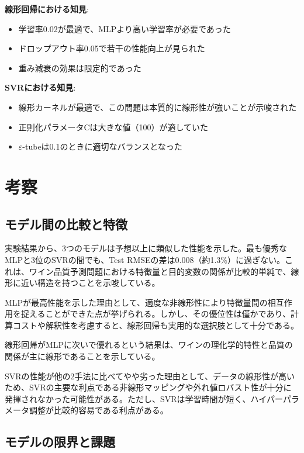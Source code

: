 \documentclass[12pt,a4paper,dvipdfmx]{jsarticle}
\begin{document}
\textbf{線形回帰における知見}:
\begin{itemize}
    \item 学習率0.02が最適で、MLPより高い学習率が必要であった
    \item ドロップアウト率0.05で若干の性能向上が見られた
    \item 重み減衰の効果は限定的であった
\end{itemize}

\textbf{SVRにおける知見}:
\begin{itemize}
    \item 線形カーネルが最適で、この問題は本質的に線形性が強いことが示唆された
    \item 正則化パラメータCは大きな値（100）が適していた
    \item $\varepsilon$-tubeは0.1のときに適切なバランスとなった
\end{itemize}

\section{考察}

\subsection{モデル間の比較と特徴}

実験結果から、3つのモデルは予想以上に類似した性能を示した。最も優秀なMLPと3位のSVRの間でも、Test RMSEの差は0.008（約1.3\%）に過ぎない。これは、ワイン品質予測問題における特徴量と目的変数の関係が比較的単純で、線形に近い構造を持つことを示唆している。

MLPが最高性能を示した理由として、適度な非線形性により特徴量間の相互作用を捉えることができた点が挙げられる。しかし、その優位性は僅かであり、計算コストや解釈性を考慮すると、線形回帰も実用的な選択肢として十分である。

線形回帰がMLPに次いで優れるという結果は、ワインの理化学的特性と品質の関係が主に線形であることを示している。

SVRの性能が他の2手法に比べてやや劣った理由として、データの線形性が高いため、SVRの主要な利点である非線形マッピングや外れ値ロバスト性が十分に発揮されなかった可能性がある。ただし、SVRは学習時間が短く、ハイパーパラメータ調整が比較的容易である利点がある。

\subsection{モデルの限界と課題}
\end{document}
